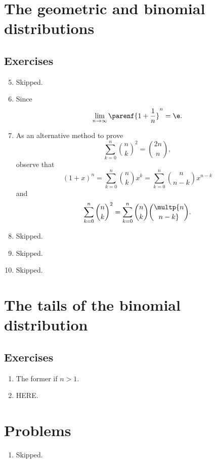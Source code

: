 \section{The geometric and binomial distributions}
\subsection*{Exercises}
\begin{enumerate}[\thesection-1]
%
\setcounter{enumi}{4}
%
\item Skipped.
%
\item Since
\[
\lim_{n \to \infty} \parenf{1 + \frac{1}{n}}^n = \e.
\]
%
\item As an alternative method to prove
\[
\sum^n_{k = 0} {n \choose k}^2 = {2n \choose n},
\]
observe that
\[
(1 + x)^n = \sum^n_{k = 0} {n \choose k} x^k = \sum^n_{k = 0} {n \choose n - k} x^{n - k}
\]
and
\[
\sum^n_{k = 0} {n \choose k}^2 = \sum^n_{k = 0} {n \choose k} \multp {n \choose n - k}.
\]
%
\item Skipped.
%
\item Skipped.
%
\item Skipped.
%
\end{enumerate}

\section{The tails of the binomial distribution}
\subsection*{Exercises}
\begin{enumerate}[\thesection-1]
%
\item The former if $n > 1$.
%
\item HERE.
%
\end{enumerate}

\section*{Problems}
\begin{enumerate}[\thechapter-1]
%
\item Skipped.
%
\end{enumerate}